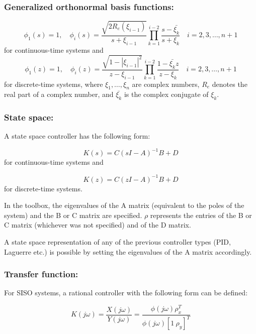 \documentclass [12pt , a4paper] {report}
\begin{document}
\subsubsection{Generalized orthonormal basis functions:}

\begin{equation}
\phi_1(s)=1, \quad \phi_i(s)=\frac{\sqrt{2R_e(\xi_{i-1})}}{s+\xi_{i-1}} \prod_{k=1}^{i-2}\frac{s-\bar{\xi_k}}{s+\xi_k} \quad  i=2,3,\ldots,n+1 
\end{equation}
for continuous-time systems and
\begin{equation}
\phi_1(z)=1, \quad \phi_i(z)=\frac{\sqrt{1-|\xi_{i-1}|^2}}{z-\xi_{i-1}} \prod_{k=1}^{i-2}\frac{1-\bar{\xi_k}z}{z-\xi_k} \quad  i=2,3,\ldots,n+1 
\end{equation}
for discrete-time systems,
where $\xi_1, \ldots, \xi_n$ are complex numbers, $R_e$ denotes the real part of a complex number, and $\bar{\xi_k}$ is the complex conjugate of $\xi_k$.

\subsubsection{State space:}
A state space controller has the following form:

\begin{equation}
    K(s) = C \left(s I - A\right)^{-1} B + D
\end{equation}
for continuous-time systems and 

\begin{equation}
    K(z) = C \left(z I - A\right)^{-1} B + D
\end{equation}
for discrete-time systems.

In the toolbox, the eigenvalues of the A matrix (equivalent to the poles of the system) and the B or C matrix are specified. $\rho$ represents the entries of the B or C matrix (whichever was not specified) and of the D matrix.

A state space representation of any of the previous controller types (PID, Laguerre etc.) is possible by setting the eigenvalues of the A matrix accordingly.

\subsubsection{Transfer function:}
For SISO systems, a rational controller with the following form can be defined:

\begin{equation}
    K(j\omega) = \frac{X(j\omega)}{Y(j\omega)} = \frac{\phi(j\omega) \rho_x^T}{\phi(j\omega) [1 \ \rho_y]^T}
\end{equation}
\end{document}
